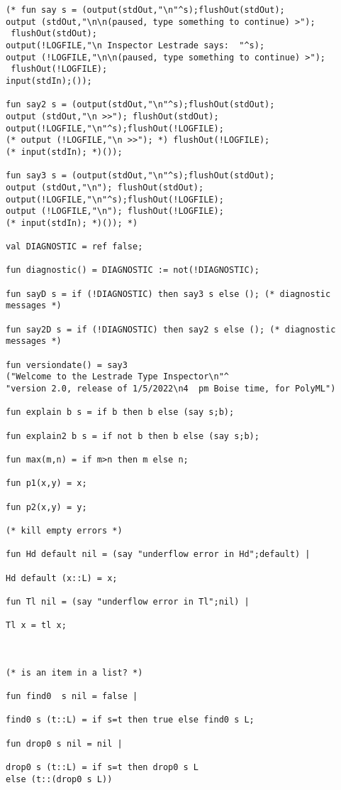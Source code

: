 \documentclass[12pt]{article}
\begin{document}
\begin{verbatim}
(* fun say s = (output(stdOut,"\n"^s);flushOut(stdOut);
output (stdOut,"\n\n(paused, type something to continue) >");
 flushOut(stdOut);
output(!LOGFILE,"\n Inspector Lestrade says:  "^s);
output (!LOGFILE,"\n\n(paused, type something to continue) >");
 flushOut(!LOGFILE);
input(stdIn);());

fun say2 s = (output(stdOut,"\n"^s);flushOut(stdOut);
output (stdOut,"\n >>"); flushOut(stdOut);
output(!LOGFILE,"\n"^s);flushOut(!LOGFILE);
(* output (!LOGFILE,"\n >>"); *) flushOut(!LOGFILE);
(* input(stdIn); *)());

fun say3 s = (output(stdOut,"\n"^s);flushOut(stdOut);
output (stdOut,"\n"); flushOut(stdOut);
output(!LOGFILE,"\n"^s);flushOut(!LOGFILE);
output (!LOGFILE,"\n"); flushOut(!LOGFILE);
(* input(stdIn); *)()); *)

val DIAGNOSTIC = ref false;

fun diagnostic() = DIAGNOSTIC := not(!DIAGNOSTIC);

fun sayD s = if (!DIAGNOSTIC) then say3 s else (); (* diagnostic messages *)

fun say2D s = if (!DIAGNOSTIC) then say2 s else (); (* diagnostic messages *)

fun versiondate() = say3
("Welcome to the Lestrade Type Inspector\n"^
"version 2.0, release of 1/5/2022\n4  pm Boise time, for PolyML")

fun explain b s = if b then b else (say s;b);

fun explain2 b s = if not b then b else (say s;b);

fun max(m,n) = if m>n then m else n;

fun p1(x,y) = x;

fun p2(x,y) = y;

(* kill empty errors *)

fun Hd default nil = (say "underflow error in Hd";default) |

Hd default (x::L) = x;

fun Tl nil = (say "underflow error in Tl";nil) |

Tl x = tl x;



(* is an item in a list? *)

fun find0  s nil = false |

find0 s (t::L) = if s=t then true else find0 s L;

fun drop0 s nil = nil |

drop0 s (t::L) = if s=t then drop0 s L
else (t::(drop0 s L))


\end{verbatim}
\end{document}
